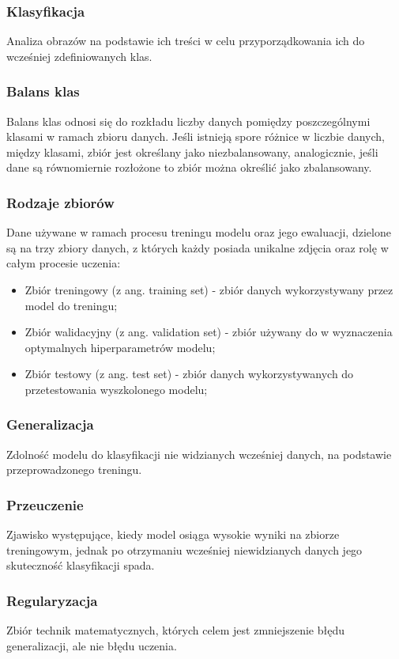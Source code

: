 \subsubsection{Klasyfikacja}
Analiza obrazów na podstawie ich treści w celu przyporządkowania ich do wcześniej zdefiniowanych klas.
\subsubsection{Balans klas}
Balans klas odnosi się do rozkładu liczby danych pomiędzy poszczególnymi klasami \newline w ramach zbioru danych. Jeśli istnieją spore różnice w liczbie danych, między klasami, zbiór jest określany jako niezbalansowany, analogicznie, jeśli dane są równomiernie rozłożone to zbiór można określić jako zbalansowany.
\subsubsection{Rodzaje zbiorów}
Dane używane w ramach procesu treningu modelu oraz jego ewaluacji, dzielone są na trzy zbiory danych, z których każdy posiada unikalne zdjęcia oraz rolę w całym procesie uczenia:
 \begin{itemize}
 	\item Zbiór treningowy (z ang. training set) - zbiór danych wykorzystywany przez model do treningu;
 	\item Zbiór walidacyjny (z ang. validation set) - zbiór używany do w wyznaczenia optymalnych hiperparametrów modelu;
 	\item Zbiór testowy (z ang. test set) - zbiór danych wykorzystywanych do przetestowania wyszkolonego modelu;
 \end{itemize}
\subsubsection{Generalizacja}
Zdolność modelu do klasyfikacji nie widzianych wcześniej danych, na podstawie przeprowadzonego treningu.\cite{Goodfellow-et-al-2016}

\subsubsection{Przeuczenie}
Zjawisko występujące, kiedy model osiąga wysokie wyniki na zbiorze treningowym, jednak po otrzymaniu wcześniej niewidzianych danych jego skuteczność klasyfikacji spada. \cite{Ying_2019}

\subsubsection{Regularyzacja}
Zbiór technik matematycznych, których celem jest zmniejszenie błędu generalizacji, ale nie błędu uczenia.
\cite{Goodfellow-et-al-2016}

